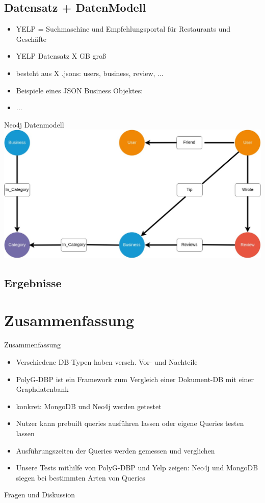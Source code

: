 \documentclass[12pt,usenames,dvipsnames]{beamer}
\begin{document}
\subsection{Datensatz + DatenModell}
\begin{frame}
\begin{itemize}[<+- | alert@+>]
\item YELP = Suchmaschine und Empfehlungsportal für Restaurants und Geschäfte 
\item YELP Datensatz X GB groß
\item besteht aus X .jsons: users, business, review, ...
\item Beispiele eines JSON Business Objektes:
\item ...
\end{itemize}
\end{frame}
\begin{frame}{Neo4j Datenmodell}
\includegraphics[width=1\textwidth]{neo4jModell}

\end{frame}
\subsection{Ergebnisse}
	\section{Zusammenfassung}
	\begin{frame}{Zusammenfassung}
	\begin{itemize}[<+- | alert@+>]
	\item Verschiedene DB-Typen haben versch. Vor- und Nachteile
	\item PolyG-DBP ist ein Framework zum Vergleich einer Dokument-DB mit einer Graphdatenbank
	\item konkret: MongoDB und Neo4j werden getestet
	\item Nutzer kann prebuilt queries ausführen lassen oder eigene Queries testen lassen
	\item Ausführungszeiten der Queries werden gemessen und verglichen
	\item Unsere Tests mithilfe von PolyG-DBP und Yelp zeigen: Neo4j und MongoDB siegen bei bestimmten Arten von Queries
	\end{itemize}
	\end{frame}
\begin{frame}[standout]
  Fragen und Diskussion
\end{frame}
\end{document}
